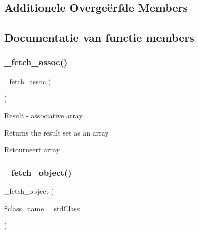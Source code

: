 \subsection*{Additionele Overge\"{e}rfde Members}


\subsection{Documentatie van functie members}
\mbox{\label{class_c_i___d_b__postgre__result_a43a9a92817f1334a1c10752ec44275a0}} 
\subsubsection{\texorpdfstring{\_fetch\_assoc()}{\_fetch\_assoc()}}
{\footnotesize\ttfamily \+\_\+fetch\+\_\+assoc (\begin{DoxyParamCaption}{ }\end{DoxyParamCaption})\hspace{0.3cm}{\ttfamily [protected]}}

Result -\/ associative array

Returns the result set as an array

\begin{DoxyReturn}{Retourneert}
array 
\end{DoxyReturn}
\mbox{\label{class_c_i___d_b__postgre__result_a60806be6a9c2488820813c2a7f4fef71}} 
\subsubsection{\texorpdfstring{\_fetch\_object()}{\_fetch\_object()}}
{\footnotesize\ttfamily \+\_\+fetch\+\_\+object (\begin{DoxyParamCaption}\item[{}]{\$class\+\_\+name = {\ttfamily \textquotesingle{}stdClass\textquotesingle{}} }\end{DoxyParamCaption})\hspace{0.3cm}{\ttfamily [protected]}}

